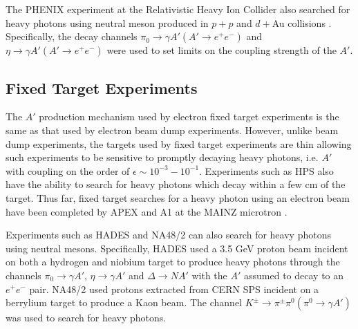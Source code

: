 The PHENIX experiment at the Relativistic Heavy Ion Collider also searched for
heavy photons using neutral meson produced in $p+p$  and $d+$Au collisions 
\cite{Adare:2014mgk}.
Specifically, the decay channels $\pi_0 \rightarrow \gamma A' (A' \rightarrow e^+e^-)$
and $\eta \rightarrow \gamma A' (A' \rightarrow e^+e^-)$ were used to set limits on the 
coupling strength of the $A'$.

\subsection{Fixed Target Experiments}

The $A'$ production mechanism used by electron fixed target experiments is 
the same as that used by electron beam dump experiments. However, unlike beam
dump experiments, the targets used by fixed target experiments are thin allowing
such experiments to be sensitive to promptly decaying heavy photons, i.e. 
$A'$ with coupling on the order of $\epsilon \sim 10^{-3} - 10^{-1}$.
Experiments such as HPS also have the 
ability to search  for heavy photons which decay within a few cm of the target.
Thus far, fixed target searches for a heavy photon using an electron beam
have been completed by APEX \cite{Abrahamyan:2011gv} and A1 at the 
MAINZ microtron \cite{Merkel:2014avp}.

Experiments such as HADES \cite{Agakishiev:2013fwl} and NA48/2 \cite{Batley:2015lha}
can also search for heavy photons using 
neutral mesons.  Specifically, HADES used a 3.5 GeV proton beam incident on 
both a hydrogen and niobium target to produce heavy photons through the 
channels $\pi_0 \rightarrow \gamma A'$, $\eta \rightarrow \gamma A'$ and 
$\Delta \rightarrow N A'$ with the $A'$ assumed to decay to an $e^+e^-$ pair.
NA48/2 used protons extracted from CERN SPS incident on a berrylium target to 
produce a Kaon beam.  The channel $K^{\pm} \rightarrow \pi^{\pm}\pi^0 (\pi^0 \rightarrow \gamma A')$
was used to search for heavy photons.  
